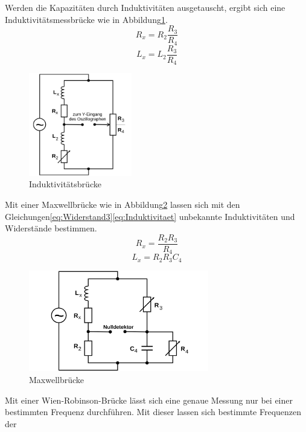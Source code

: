 Werden die Kapazitäten durch Induktivitäten ausgetauscht, ergibt sich eine
Induktivitätsmessbrücke wie in Abbildung\ref{fig:indbruecke}.
\begin{equation}
R_x=R_2\frac{R_3}{R_4}
\end{equation}
\begin{equation}
L_x=L_2 \frac{R_3}{R_4}
\end{equation}
\begin{figure}
  \centering
  \includegraphics[width=0.4\textwidth]{Bilder/Induktivitaetsbruecke.png}
  \caption{Induktivitätsbrücke}
  \label{fig:indbruecke}
\end{figure}
Mit einer Maxwellbrücke wie in Abbildung\ref{fig:Maxwellb} lassen sich mit
den Gleichungen\eqref{eq:Widerstand3}\eqref{eq:Induktivitaet} unbekannte
Induktivitäten und Widerstände bestimmen.
\begin{equation}
R_x= \frac{R_2 R_3}{R_4}
\label{eq:Widerstand3}
\end{equation}
\begin{equation}
L_x=R_2 R_3 C_4
\label{eq:Induktivitaet}
\end{equation}
\begin{figure}
  \centering
  \includegraphics[width=0.7\textwidth]{Bilder/Maxwellbruecke.png}
  \caption{Maxwellbrücke}
  \label{fig:Maxwellb}
\end{figure}
Mit einer Wien-Robinson-Brücke lässt sich eine genaue Messung nur bei einer
bestimmten Frequenz durchführen. Mit dieser lassen sich bestimmte Frequenzen der
